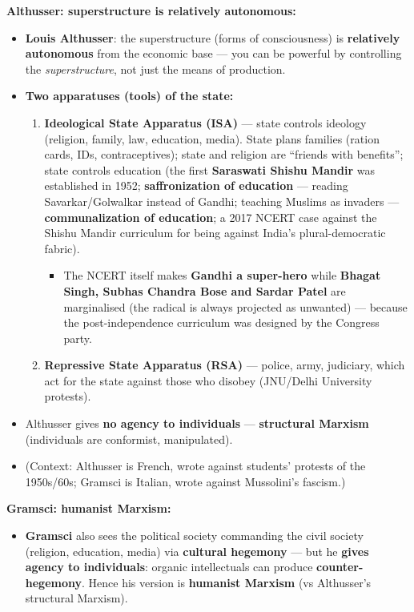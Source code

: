 \begin{KeyConcept}
\textbf{Althusser: superstructure is relatively autonomous:}
\begin{itemize}
\item \textbf{Louis Althusser}: the superstructure (forms of consciousness) is \textbf{relatively autonomous} from the economic base --- you can be powerful by controlling the \textit{superstructure}, not just the means of production.
\item \textbf{Two apparatuses (tools) of the state:}
\begin{enumerate}
\item \textbf{Ideological State Apparatus (ISA)} --- state controls ideology (religion, family, law, education, media). State plans families (ration cards, IDs, contraceptives); state and religion are ``friends with benefits''; state controls education (the first \textbf{Saraswati Shishu Mandir} was established in 1952; \textbf{saffronization of education} --- reading Savarkar/Golwalkar instead of Gandhi; teaching Muslims as invaders --- \textbf{communalization of education}; a 2017 NCERT case against the Shishu Mandir curriculum for being against India's plural-democratic fabric).
\begin{itemize}
\item The NCERT itself makes \textbf{Gandhi a super-hero} while \textbf{Bhagat Singh, Subhas Chandra Bose and Sardar Patel} are marginalised (the radical is always projected as unwanted) --- because the post-independence curriculum was designed by the Congress party.
\end{itemize}
\item \textbf{Repressive State Apparatus (RSA)} --- police, army, judiciary, which act for the state against those who disobey (JNU/Delhi University protests).
\end{enumerate}
\item Althusser gives \textbf{no agency to individuals} --- \textbf{structural Marxism} (individuals are conformist, manipulated).
\item (Context: Althusser is French, wrote against students' protests of the 1950s/60s; Gramsci is Italian, wrote against Mussolini's fascism.)
\end{itemize}
\end{KeyConcept}

\begin{KeyConcept}
\textbf{Gramsci: humanist Marxism:}
\begin{itemize}
\item \textbf{Gramsci} also sees the political society commanding the civil society (religion, education, media) via \textbf{cultural hegemony} --- but he \textbf{gives agency to individuals}: organic intellectuals can produce \textbf{counter-hegemony}. Hence his version is \textbf{humanist Marxism} (vs Althusser's structural Marxism).
\end{itemize}
\end{KeyConcept}

